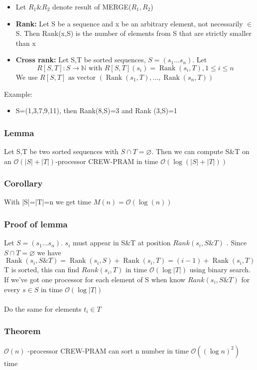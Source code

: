 \documentclass{article}[18pt]
\newcommand{\seq}[3]{#1_{#2}\ldots#1_{#3}}
\begin{document}
\begin{itemize}
	\item Let $R_1\&R_2$ denote result of MERGE($R_1,R_2$)
	\item \textbf{Rank:} Let S be a sequence and x be an arbitrary element, not necessarily $\in$ S. Then Rank(x,S) is the number of elements from S that are strictly smaller than x
	\item \textbf{Cross rank:} Let S,T be sorted sequences, $S=(\seq{s}{1}{n})$. Let
$$R [ S , T ] : S \rightarrow \mathbb { N } \text { with } R [ S , T ] \left( s _ { i } \right) = \operatorname { Rank } \left( s _ { i } , T \right) , 1 \leq i \leq n$$
We use $R [ S , T ] \text { as vector } \left( \operatorname { Rank } \left( s _ { 1 } , T \right) , \ldots , \operatorname { Rank } \left( s _ { n } , T \right) \right)$
\end{itemize}
Example:
\begin{itemize}
\item S=(1,3,7,9,11), then Rank(8,S)=3 and Rank (3,S)=1
\end{itemize}
\subsubsection{Lemma}
Let S,T be two sorted sequences with $S\cap T=\varnothing$. Then we can compute S\&T on an $\mathcal{O}(|S|+|T|)$-processor CREW-PRAM in time $\mathcal{O}(\log(|S|+|T|))$
\subsubsection{Corollary}
With |S|=|T|=n  we get time $M(n)=\mathcal{O}(\log(n))$
\subsubsection{Proof of lemma}
Let $S=(\seq{s}{1}{n})$. $s_i$ must appear in S\&T at position $Rank(s_i,S\&T)$ . Since $S\cap T=\varnothing$ we have
$$\operatorname { Rank } \left( s _ { i } , S \& T \right) = \operatorname { Rank } \left( s _ { i } , S \right) + \operatorname { Rank } \left( s _ { i } , T \right) = ( i - 1 ) + \operatorname { Rank } \left( s _ { i } , T \right)$$
T is sorted, this can find $Rank(s_i,T)$ in time $\mathcal{O}(\log |T|)$ using binary search. If we've got one processor for each element of S when know $Rank(s_i,S\&T)$ for every $s\in S$ in time $\mathcal{O}(\log |T|)$\\
\\
Do the same for elements $t_i\in T$
\subsubsection{Theorem}
$\mathcal{O}(n)$ -processor CREW-PRAM can sort n number in time $\mathcal{O}((\log n)^2)$ time
\end{document}
